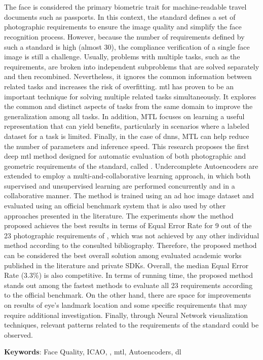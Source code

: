 \section*{}

The face is considered the primary biometric trait for machine-readable travel documents such as passports. In this context, the \icao standard defines a set of photographic requirements to ensure the image quality and simplify the face recognition process. However, because the number of requirements defined by such a standard is high (almost 30), the compliance verification of a single face image is still a challenge. Usually, problems with multiple tasks, such as the \icao requirements, are broken into independent subproblems that are solved separately and then recombined. Nevertheless, it ignores the common information between related tasks and increases the risk of overfitting. \acf{mtl} has proven to be an important technique for solving multiple related tasks simultaneously. It explores the common and distinct aspects of tasks from the same domain to improve the generalization among all tasks. In addition, MTL focuses on learning a useful representation that can yield benefits, particularly in scenarios where a labeled dataset for a task is limited. Finally, in the case of \aclp{dnn}, MTL can help reduce the number of parameters and inference speed. This research proposes the first deep \acl{mtl} method designed for automatic evaluation of both photographic and geometric requirements of the \icao standard, called \methodname. Undercomplete Autoencoders are extended to employ a multi-and-collaborative learning approach, in which both supervised and unsupervised learning are performed concurrently and in a collaborative manner. The method is trained using an ad hoc image dataset and evaluated using an official benchmark system that is also used by other approaches presented in the literature. The experiments show the method proposed achieves the best results in terms of Equal Error Rate for 9 out of the 23 photographic requirements of \icao, which was not achieved by any other individual method according to the consulted bibliography. Therefore, the proposed method can be considered the best overall solution among evaluated academic works published in the literature and private SDKs. Overall, the median Equal Error Rate (3.3\%) is also competitive. In terms of running time, the proposed method stands out among the fastest methods to evaluate all 23 requirements according to the official benchmark. On the other hand, there are space for improvements on results of eye's landmark location and some specific requirements that may require additional investigation. Finally, through Neural Network visualization techniques, relevant patterns related to the requirements of the \icao standard could be observed. 

\vspace{2em}

\noindent
\textbf{Keywords}: Face Quality, ICAO, \icao, \acl{mtl}, Autoencoders, \acl{dl}

\newpage
